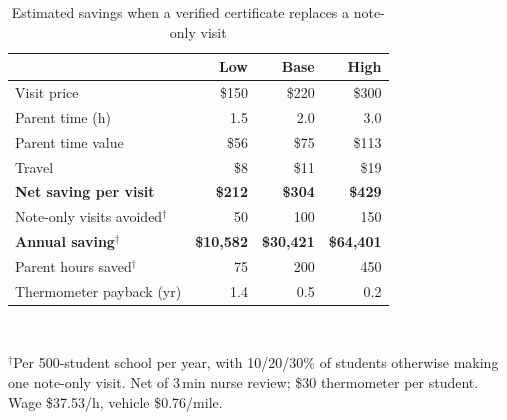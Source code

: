\begin{table}[t]\centering\caption{Estimated savings when a verified certificate replaces a note-only visit}\label{tab:cost}\footnotesize\setlength{\tabcolsep}{4pt}
\begin{tabular}{lrrr}\hline
& Low & Base & High \\\hline
Visit price & \$150 & \$220 & \$300 \\
Parent time (h) & 1.5 & 2.0 & 3.0 \\
Parent time value & \$56 & \$75 & \$113 \\
Travel & \$8 & \$11 & \$19 \\
\textbf{Net saving per visit} & \textbf{\$212} & \textbf{\$304} & \textbf{\$429} \\
Note-only visits avoided$^{\dagger}$ & 50 & 100 & 150 \\
\textbf{Annual saving}$^{\dagger}$ & \textbf{\$10,582} & \textbf{\$30,421} & \textbf{\$64,401} \\
Parent hours saved$^{\dagger}$ & 75 & 200 & 450 \\
Thermometer payback (yr) & 1.4 & 0.5 & 0.2 \\
\hline\end{tabular}\\[2pt]\parbox{\columnwidth}{\scriptsize $^{\dagger}$Per 500-student school per year, with 10/20/30\% of students otherwise making one note-only visit. Net of 3\,min nurse review; \$30 thermometer per student. Wage \$37.53/h, vehicle \$0.76/mile.}\end{table}
